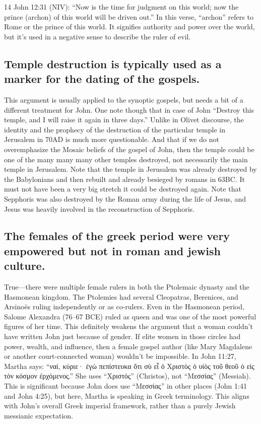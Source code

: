 14 John 12:31 (NIV): ``Now is the time for judgment on this world; now the prince (archon) of this world will be driven out.'' In this verse, ``archon'' refers to Rome or the prince of this world.
It signifies authority and power over the world, but it's used in a negative sense to describe the ruler of evil.

\subsection{Temple destruction is typically used as a marker for the dating of the gospels.}\label{subsec:temple-destruction-is-typically-used-as-a-marker-for-the-dating-of-the-gospels.}

This argument is usually applied to the synoptic gospels, but needs a bit of a different treatment for John.
One note though that in case of John ``Destroy this temple, and I will raise it again in three days.'' Unlike in Olivet discourse, the identity and the prophecy of the destruction of the particular temple in Jerusalem in 70AD is much more questionable.
And that if we do not overemphasize the Mosaic beliefs of the gospel of John, then the temple could be one of the many many many other temples destroyed, not necessarily the main temple in Jerusalem.
Note that the temple in Jerusalem was already destroyed by the Babylonians and then rebuilt and already besieged by romans in 63BC.
It must not have been a very big stretch it could be destroyed again.
Note that Sepphoris was also destroyed by the Roman army during the life of Jesus, and Jesus was heavily involved in the reconstruction of Sepphoris.

\subsection{The females of the greek period were very empowered but not in roman and jewish culture.}\label{subsec:the-females-of-the-greek-period-were-very-empowered-but-not-in-roman-and-jewish-culture.}

True---there were multiple female rulers in both the Ptolemaic dynasty and the Hasmonean kingdom.
The Ptolemies had several Cleopatras, Berenices, and Arsinoës ruling independently or as co-rulers.
Even in the Hasmonean period, Salome Alexandra (76--67 BCE) ruled as queen and was one of the most powerful figures of her time.
This definitely weakens the argument that a woman couldn't have written John just because of gender.
If elite women in those circles had power, wealth, and influence, then a female gospel author (like Mary Magdalene or another court-connected woman) wouldn't be impossible.
In John 11:27, Martha says: ``ναί, κύριε· ἐγὼ πεπίστευκα ὅτι σὺ εἶ ὁ Χριστὸς ὁ υἱὸς τοῦ θεοῦ ὁ εἰς τὸν κόσμον ἐρχόμενος.'' She uses ``Χριστός'' (Christos), not ``Μεσσίας'' (Messiah).
This is significant because John does use ``Μεσσίας'' in other places (John 1:41 and John 4:25), but here, Martha is speaking in Greek terminology.
This aligns with John's overall Greek imperial framework, rather than a purely Jewish messianic expectation.

